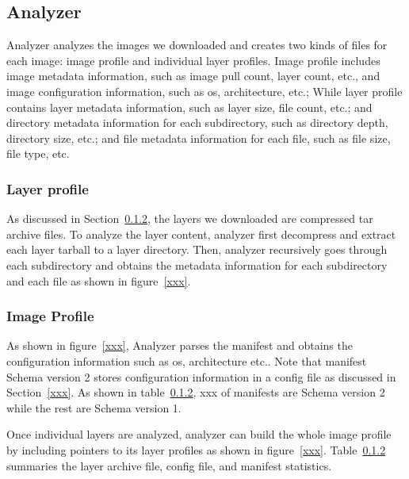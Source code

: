 \subsection{Analyzer}

Analyzer analyzes the images we downloaded and creates two kinds of files for each image: image profile and individual layer profiles. Image profile includes image metadata information, such as image pull count, layer count, etc., and image configuration information, such as os, architecture, etc.; While layer profile contains layer metadata information, such as layer size, file count, etc.; and directory metadata information for each subdirectory, such as directory depth, directory size, etc.; and file metadata information for each file, such as file size, file type, etc.

\subsubsection{Layer profile}

As discussed in Section~\ref{}, the layers we downloaded are compressed tar archive files. To analyze the layer content, analyzer first decompress and extract each layer tarball to a layer directory. Then, analyzer recursively goes through each subdirectory and obtains the metadata information for each subdirectory and each file as shown in figure~\ref{xxx}.



\subsubsection{Image Profile}

As shown in figure~\ref{xxx}, Analyzer parses the manifest and obtains the configuration information such as os, architecture etc.. Note that manifest Schema version 2 stores configuration information in a config file as discussed in Section~\ref{xxx}. As shown in table~\ref{}, xxx of manifests are Schema version 2 while the rest are Schema version 1. 

Once individual layers are analyzed, analyzer can build the whole image profile by including pointers to its layer profiles as shown in figure~\ref{xxx}. Table~\ref{} summaries the layer archive file, config file, and manifest statistics.
 



